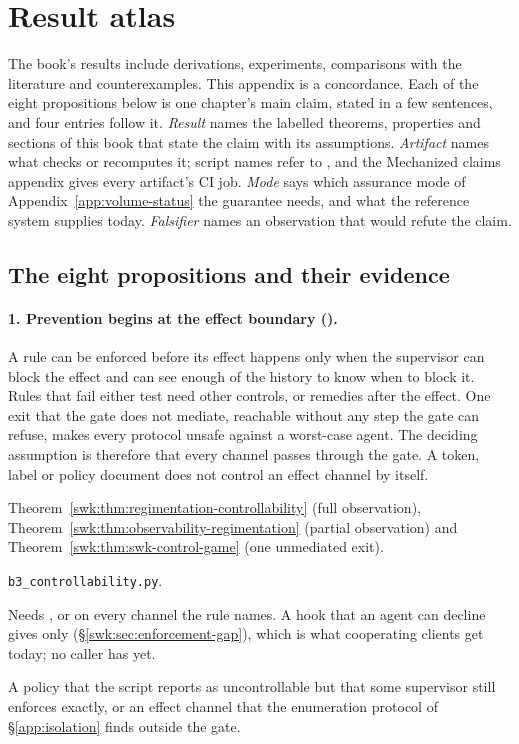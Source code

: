 \section{Result atlas}\label{app:result-atlas}\label{app:one-spine}

The book's results include derivations, experiments, comparisons with the
literature and counterexamples. This appendix is a concordance. Each of the
eight propositions below is one chapter's main claim, stated in a few
sentences, and four entries follow it. \emph{Result} names the labelled
theorems, properties and sections of this book that state the claim with its
assumptions. \emph{Artifact} names what checks or recomputes it; script names
refer to , and the Mechanized claims
appendix gives every artifact's CI job. \emph{Mode} says
which assurance mode of Appendix~\ref{app:volume-status} the guarantee needs,
and what the reference system supplies today. \emph{Falsifier} names an
observation that would refute the claim.

\subsection{The eight propositions and their evidence}

\paragraph{1. Prevention begins at the effect boundary ().}
A rule can be enforced before its effect happens only when the supervisor can
block the effect and can see enough of the history to know when to block it.
Rules that fail either test need other controls, or remedies after the effect.
One exit that the gate does not mediate, reachable without any step the gate
can refuse, makes every protocol unsafe against a worst-case agent. The
deciding assumption is therefore that every channel passes through the gate. A
token, label or policy document does not control an effect channel by itself.
\begin{description}[leftmargin=1.4em,itemsep=1pt]
  \item[Result] Theorem~\ref{swk:thm:regimentation-controllability} (full
  observation), Theorem~\ref{swk:thm:observability-regimentation} (partial
  observation) and Theorem~\ref{swk:thm:swk-control-game} (one unmediated
  exit).
  \item[Artifact] \texttt{b3\_controllability.py}.
  \item[Mode] Needs ,  or
   on every channel the rule names. A hook that an agent
  can decline gives only 
  (\S\ref{swk:sec:enforcement-gap}), which is what cooperating clients get
  today; no caller has  yet.
  \item[Falsifier] A policy that the script reports as uncontrollable but that
  some supervisor still enforces exactly, or an effect channel that the
  enumeration protocol of \S\ref{app:isolation} finds outside the gate.
\end{description}

